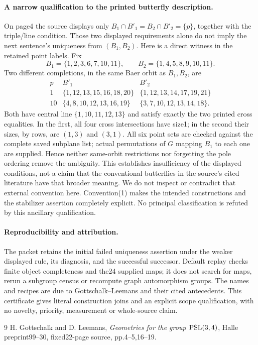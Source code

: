 \documentclass[11pt]{article}
\begin{document}
\paragraph{A narrow qualification to the printed butterfly description.}
On page4 the source displays only
$B_1\cap B'_1=B_2\cap B'_2=\{p\}$, together with the triple/line
condition. Those two displayed requirements alone do not imply the next
sentence's uniqueness from $(B_1,B_2)$. Here is a direct witness in the
retained point labels. Fix
\[
 B_1=\{1,2,3,6,7,10,11\},\qquad B_2=\{1,4,5,8,9,10,11\}.
\]
Two different completions, in the same Baer orbit as $B_1,B_2$, are
\[
\begin{array}{c|l|l}
p&B'_1&B'_2\\\hline
1&\{1,12,13,15,16,18,20\}&\{1,12,13,14,17,19,21\}\\
10&\{4,8,10,12,13,16,19\}&\{3,7,10,12,13,14,18\}.
\end{array}
\]
Both have central line $\{1,10,11,12,13\}$ and satisfy exactly the two
printed cross equalities. In the first, all four cross intersections have
size1; in the second their sizes, by rows, are $(1,3)$ and $(3,1)$.
All six point sets are checked against the complete saved subplane list;
actual permutations of $G$ mapping $B_1$ to each one are supplied. Hence
neither same-orbit restrictions nor forgetting the pole ordering remove
the ambiguity. This establishes insufficiency of the displayed conditions,
not a claim that the conventional butterflies in the source's cited
literature have that broader meaning. We do not inspect or contradict that
external convention here. Convention(1) makes the intended constructions
and the stabilizer assertion completely explicit. No principal
classification is refuted by this ancillary qualification.

\paragraph{Reproducibility and attribution.}
The packet retains the initial failed uniqueness assertion under the weaker
displayed rule, its diagnosis, and the successful successor. Default replay
checks finite object completeness and the24 supplied maps; it does not
search for maps, rerun a subgroup census or recompute graph automorphism
groups. The names and recipes are due to Gottschalk--Leemans and their cited
antecedents. This certificate gives literal construction joins and an explicit
scope qualification, with no novelty, priority, measurement or whole-source claim.
\begin{thebibliography}{9}
 H. Gottschalk and D. Leemans, \emph{Geometries for the group
$\operatorname{PSL}(3,4)$}, Halle preprint99--30, fixed22-page source, pp.4--5,16--19.
\end{thebibliography}
\end{document}
